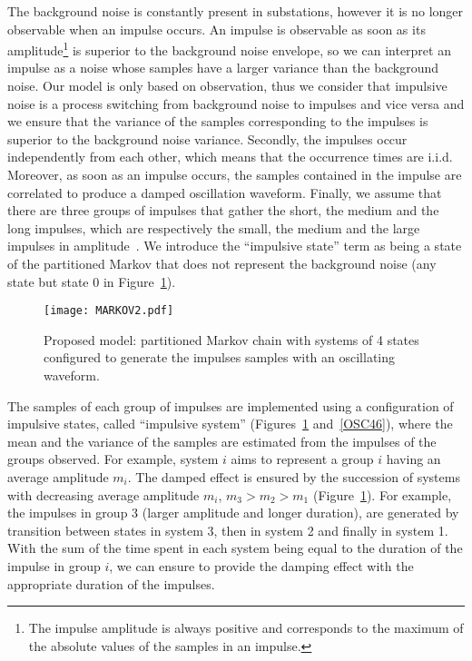 \documentclass[journal]{IEEEtran}
\begin{document}
The background noise is constantly present in substations, however it is no longer observable when an impulse occurs. An impulse is observable as soon as its amplitude\footnote{The impulse amplitude is always positive and corresponds to the maximum of the absolute values of the samples in an impulse.} is superior to the background noise envelope, so we can interpret an impulse as a noise whose samples have a larger variance than the background noise. Our model is only based on observation, thus we consider that impulsive noise is a process switching from background noise to impulses and vice versa and we ensure that the variance of the samples corresponding to the impulses is superior to the background noise variance. Secondly, the impulses occur independently from each other, which means that the occurrence times are i.i.d. Moreover, as soon as an impulse occurs, the samples contained in the impulse are correlated to produce a damped oscillation waveform. Finally, we assume that there are three groups of impulses that gather the short, the medium and the long impulses, which are respectively the small, the medium and the large impulses in amplitude~\cite{cigre}. We introduce the ``impulsive state'' term as being a state of the partitioned Markov that does not represent the background noise (any state but state 0 in Figure~\ref{mc2}).
\begin{figure}[h]
\begin{center}
  \texttt{[image: MARKOV2.pdf]}\\
\end{center}
  \caption{Proposed model: partitioned Markov chain with systems of 4 states configured to generate the impulses samples with an oscillating waveform.}\label{mc2}
\end{figure}
The samples of each group of impulses are implemented using a configuration of impulsive states, called ``impulsive system'' (Figures~\ref{mc2} and~\ref{OSC46}), where the mean and the variance of the samples are estimated from the impulses of the groups observed. For example, system $i$ aims to represent a group $i$ having an average amplitude $m_i$. The damped effect is ensured by the succession of systems with decreasing average amplitude $m_i$, $m_3>m_2>m_1$ (Figure~\ref{mc2}). For example, the impulses in group 3 (larger amplitude and longer duration), are generated by transition between states in system 3, then in system 2 and finally in system 1. With the sum of the time spent in each system being equal to the duration of the impulse in group $i$, we can ensure to provide the damping effect with the appropriate duration of the impulses.
\end{document}
